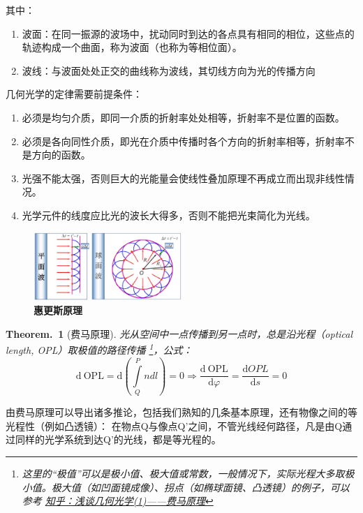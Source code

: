\documentclass[UTF8]{report}
\theoremstyle{MyLineTheoremStyle} %
\theoremstyle{MyBlockTheoremStyle} %
\newtheorem{BlockTheorem}[LineTheorem]{Theorem.\,} %
\theoremstyle{MySubsubsectionStyle} %
\begin{document}
\noindent 其中：
\begin{enumerate}
    \item 波面：在同一振源的波场中，扰动同时到达的各点具有相同的相位，这些点的轨迹构成一个曲面，称为波面（也称为等相位面）。
    \item 波线：与波面处处正交的曲线称为波线，其切线方向为光的传播方向
\end{enumerate}

\noindent 几何光学的定律需要前提条件：
\begin{enumerate}
\item 必须是均匀介质，即同一介质的折射率处处相等，折射率不是位置的函数。
\item 必须是各向同性介质，即光在介质中传播时各个方向的折射率相等，折射率不是方向的函数。
\item 光强不能太强，否则巨大的光能量会使线性叠加原理不再成立而出现非线性情况。
\item 光学元件的线度应比光的波长大得多，否则不能把光束简化为光线。
\end{enumerate}

\begin{figure}[H]\centering
\includegraphics[width=0.5\textwidth]{assets/1,2/image (46).jpg}
\caption{\textbf{惠更斯原理}}\label{惠更斯原理}
\end{figure}

\begin{BlockTheorem}[费马原理]\label{费马原理}
光从空间中一点传播到另一点时，总是沿光程（optical length, OPL）取极值的路径传播 \footnote{这里的“极值”可以是极小值、极大值或常数，一般情况下，实际光程大多取极小值。极大值（如凹面镜成像）、拐点（如椭球面镜、凸透镜）的例子，可以参考 \href{https://zhuanlan.zhihu.com/p/107739173}{知乎：浅谈几何光学(1)——费马原理}}，公式：
\begin{equation}
    \mathrm{d}\ \mathrm{OPL} =  \mathrm{d}\left(\int\limits_{Q}^{P}ndl\right)=0 \Longrightarrow \frac{\mathrm{d}\  \mathrm{OPL} }{\mathrm{d} \varphi } = \frac{\mathrm{d} OPL }{\mathrm{d} s } = 0 
\end{equation}
\end{BlockTheorem}
由费马原理可以导出诸多推论，包括我们熟知的几条基本原理，还有物像之间的等光程性（例如凸透镜）：
在物点Q与像点Q’之间，不管光线经何路径，凡是由Q通过同样的光学系统到达Q’的光线，都是等光程的。
\end{document}
